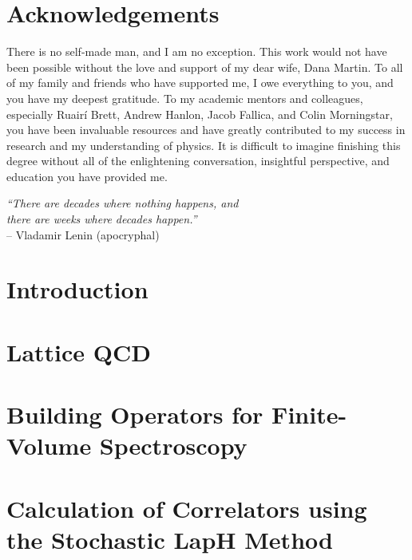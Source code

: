 \documentclass[12pt]{report}
\begin{document}
\onehalfspace


\begin{abstract}
\end{abstract}

\chapter*{Acknowledgements}
There is no self-made man, and I am no exception. This work would not have been possible without the love and support of my dear wife, Dana Martin. To all of my family and friends who have supported me, I owe everything to you, and you have my deepest gratitude. To my academic mentors and colleagues, especially Ruair\'i Brett, Andrew Hanlon, Jacob Fallica, and Colin Morningstar, you have been invaluable resources and have greatly contributed to my success in research and my understanding of physics. It is difficult to imagine finishing this degree without all of the enlightening conversation, insightful perspective, and education you have provided me.
\newpage
\null
\vfill
\begin{flushright}
    \textit{``There are decades where nothing happens, and\\
    there are weeks where decades happen.''}\\
    -- Vladamir Lenin (apocryphal)
\end{flushright}
\vfill
\tableofcontents
\listoffigures
\listoftables
\chapter{Introduction}\label{ch:introduction}


\chapter{Lattice QCD}\label{ch:latticeqcd}


\chapter{Building Operators for Finite-Volume Spectroscopy}\label{ch:operators}


\chapter{Calculation of Correlators using the Stochastic LapH Method}\label{ch:montecarlo}

\end{document}
